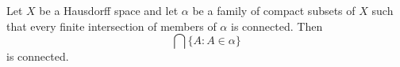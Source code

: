 Let $X$ be a Hausdorff space and let $\alpha$ be a family of compact subsets of $X$ such that every finite intersection of members of $\alpha$ is connected. Then
$$\bigcap \{A : A \in \alpha\}$$
is connected.

